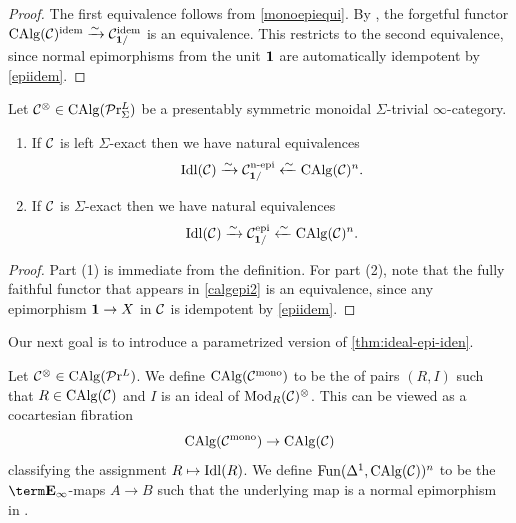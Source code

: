 \documentclass[10pt,a4paper,oneside]{article}
\begin{document}
\begin{proof}
The first equivalence follows from \cref{monoepiequi}. By \cite[Proposition 4.8.2.9]{ha}, the forgetful functor $\operatorname{CAlg}(\mathcal{C})^{\operatorname{idem}}\xrightarrow{\sim} \mathcal{C}_{\mathbf{1}/}^{\operatorname{idem}}$ is an equivalence. This restricts to the second equivalence, since normal epimorphisms from the unit $\mathbf{1}$ are automatically idempotent by \cref{epiidem}.
\end{proof}

\begin{cor}\label{cor:ideal-epi-iden}
Let $\mathcal{C}^\otimes\in\operatorname{CAlg}(\mathcal{P}\mathrm{r}^L_{\Sigma})$ be a presentably symmetric monoidal $\Sigma$-trivial $\infty$-category.
\begin{enumerate}
\item If $\mathcal{C}$ is left $\Sigma$-exact then we have natural equivalences $$\operatorname{Idl}(\mathcal{C})\xrightarrow{\sim}\mathcal{C}_{\mathbf{1}/}^{\operatorname{n-epi}}\xleftarrow{\sim}\operatorname{CAlg}(\mathcal{C})^n.$$ %
\item If $\mathcal{C}$ is $\Sigma$-exact then we have natural equivalences $$\operatorname{Idl}(\mathcal{C})\xrightarrow{\sim}\mathcal{C}_{\mathbf{1}/}^{\operatorname{epi}}\xleftarrow{\sim}\operatorname{CAlg}(\mathcal{C})^n.$$ 
\end{enumerate}
\end{cor}

\begin{proof}
Part (1) is immediate from the definition. For part (2), note that the fully faithful functor that appears in \cref{calgepi2} is an equivalence, since any epimorphism $\mathbf{1}\to X$ in $\mathcal{C}$ is idempotent by \cref{epiidem}.
\end{proof}

\begin{rem}
Our next goal is to introduce a parametrized version of \cref{thm:ideal-epi-iden}.
\end{rem}

\begin{de}
Let $\mathcal{C}^\otimes\in\operatorname{CAlg}(\mathcal{P}\mathrm{r}^L)$. We define $\operatorname{CAlg}(\mathcal{C}^{\operatorname{mono}})$  to be the \infcat of pairs $(R,I)$ such that $R\in \operatorname{CAlg}(\mathcal{C})$ and $I$ is an ideal of $\operatorname{Mod}_R(\mathcal{C})^\otimes$. This can be viewed as a cocartesian fibration $$\operatorname{CAlg}(\mathcal{C}^{\operatorname{mono}}) \to \operatorname{CAlg}(\mathcal{C})$$ classifying the assignment $R\mapsto \operatorname{Idl}(R)$. We define $\operatorname{Fun}(\Delta^1,\operatorname{CAlg}(\mathcal{C}))^n$ to be the $\einf$-maps $A\to B$ such that the underlying map is a normal epimorphism in \mcc. 
\end{de}
\end{document}
